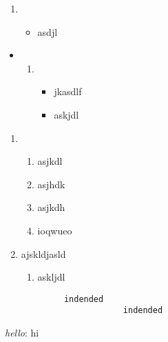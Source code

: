 \documentclass{xyz}
\begin{document}
    \begin{enumerate}
        \item {
        \begin{itemize}
            \item {
            asdjl
            }
        \end{itemize}
        }
    \end{enumerate}

    \begin{itemize}
        \item {
        \begin{enumerate}
            \item {
            \begin{itemize}
                \item jkasdlf
                \item {
                askjdl
                }
            \end{itemize}
            }
        \end{enumerate}
        }
    \end{itemize}

    \begin{enumerate}
        \item {
        \begin{enumerate}
            \item asjkdl
            \item {
            asjhdk
            }
            \item {asjkdh}
            \item {
            ioqwueo
            }
        \end{enumerate}
        }
        \item {
        ajskldjasld
        }
        \begin{enumerate}
            \item askljdl
        \end{enumerate}
    \end{enumerate}

    \begin{verbatim}
            indended
                        indended
    \end{verbatim}

    \textit{hello}: hi
\end{document}
